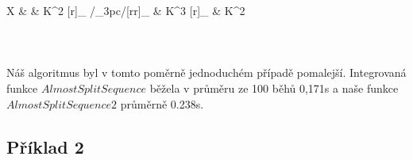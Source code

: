 {{            X
                 & 
                 & K^2 
                   \ar@{->}[r]_{\left[\begin{smallmatrix}
	               1 & 0 & 0 \\
	               0 & 1 & 0 \\
                      \end{smallmatrix}\right]} 
                   \ar@/_3pc/[rr]_{\left[\begin{smallmatrix}
	               0 & 0 \\
	               1 & 0 \\
                      \end{smallmatrix}\right]}
                 & K^3 
                   \ar@{->}[r]_{\left[\begin{smallmatrix}
	               0 & 1 \\
	               1 & 0 \\
	               0 & 1 \\
                      \end{smallmatrix}\right]}   
                 & K^2
         }} \\\\\\         
       \paragraph{ }Náš algoritmus byl v tomto poměrně jednoduchém případě pomalejší. Integrovaná 
       funkce $AlmostSplitSequence$ běžela v průměru ze 100 běhů 0,171s a naše 
       funkce $AlmostSplitSequence2$ průměrně 0.238s.
       
       \subsection*{Příklad 2}
